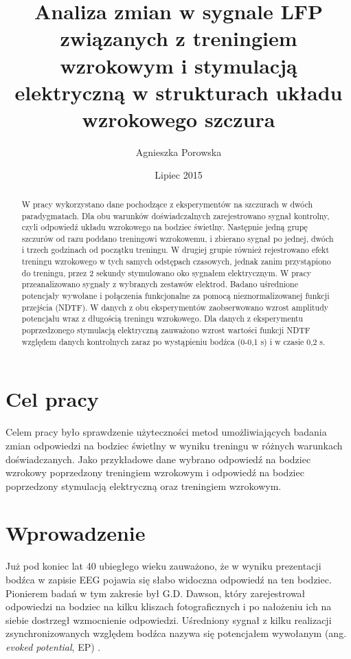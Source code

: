 \documentclass{pracamgr}
\author{Agnieszka Porowska}
\title{Analiza zmian w sygnale LFP związanych z treningiem wzrokowym i stymulacją elektryczną w strukturach układu wzrokowego szczura}
\date{Lipiec 2015}
\begin{document}
	\maketitle
	
	\begin{abstract}
		W pracy wykorzystano dane pochodzące z eksperymentów na szczurach w dwóch paradygmatach. Dla obu warunków doświadczalnych zarejestrowano sygnał kontrolny, czyli odpowiedź układu wzrokowego na bodziec świetlny. Następnie jedną grupę szczurów od razu poddano treningowi wzrokowemu, i zbierano sygnał po jednej, dwóch i trzech godzinach od początku treningu. W drugiej grupie również rejestrowano efekt treningu wzrokowego w tych samych odstępach czasowych, jednak zanim przystąpiono do treningu, przez 2 sekundy stymulowano oko sygnałem elektrycznym. W pracy przeanalizowano sygnały z wybranych zestawów elektrod. Badano uśrednione potencjały wywołane i połączenia funkcjonalne za pomocą nieznormalizowanej funkcji przejścia (NDTF). W danych z obu eksperymentów zaobserwowano wzrost amplitudy potencjału wraz z długością treningu wzrokowego. Dla danych z eksperymentu poprzedzonego stymulacją elektryczną zauważono wzrost wartości funkcji NDTF względem danych kontrolnych zaraz po wystąpieniu bodźca (0-0,1 s) i w czasie 0,2 s. 
	\end{abstract}
	
	\tableofcontents
	\chapter*{Cel pracy}
	Celem pracy było sprawdzenie użyteczności metod umożliwiających badania zmian odpowiedzi na bodziec świetlny w wyniku treningu w różnych warunkach doświadczanych. Jako przykładowe dane wybrano odpowiedź na bodziec wzrokowy poprzedzony treningiem wzrokowym i odpowiedź na bodziec poprzedzony stymulacją elektryczną oraz treningiem wzrokowym.
	\chapter{Wprowadzenie}
	Już pod koniec lat 40 ubiegłego wieku zauważono, że w wyniku prezentacji bodźca w zapisie EEG pojawia się słabo widoczna odpowiedź na ten bodziec.  Pionierem badań w tym zakresie był G.D. Dawson, który zarejestrował odpowiedzi na bodziec na kilku kliszach fotograficznych i po nałożeniu ich na siebie dostrzegł  wzmocnienie odpowiedzi. Uśredniony sygnał z kilku realizacji zsynchronizowanych względem bodźca nazywa się potencjałem wywołanym (ang. \textit{evoked potential}, EP) \citep{nieder}.
	
\end{document}
